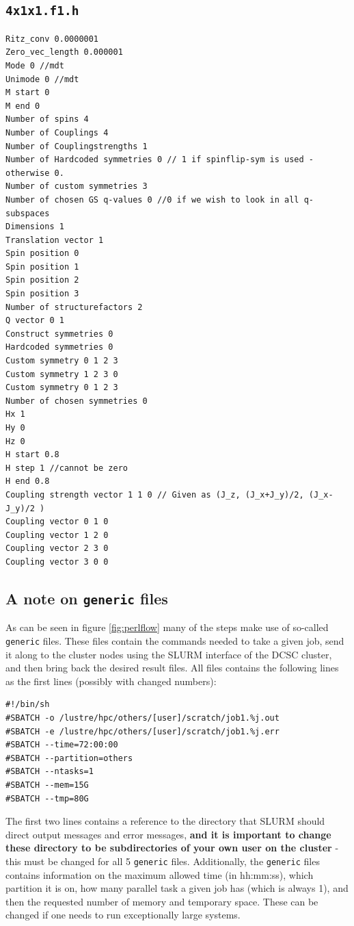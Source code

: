 \documentclass{article}
\begin{document}
\subsection{\texttt{4x1x1.f1.h}}
\begin{lstlisting}
Ritz_conv 0.0000001 
Zero_vec_length 0.000001
Mode 0 //mdt
Unimode 0 //mdt
M start 0
M end 0
Number of spins 4 
Number of Couplings 4 
Number of Couplingstrengths 1
Number of Hardcoded symmetries 0 // 1 if spinflip-sym is used - otherwise 0. 
Number of custom symmetries 3  
Number of chosen GS q-values 0 //0 if we wish to look in all q-subspaces
Dimensions 1
Translation vector 1
Spin position 0
Spin position 1
Spin position 2
Spin position 3
Number of structurefactors 2
Q vector 0 1
Construct symmetries 0
Hardcoded symmetries 0
Custom symmetry 0 1 2 3
Custom symmetry 1 2 3 0
Custom symmetry 0 1 2 3
Number of chosen symmetries 0
Hx 1
Hy 0
Hz 0
H start 0.8
H step 1 //cannot be zero
H end 0.8
Coupling strength vector 1 1 0 // Given as (J_z, (J_x+J_y)/2, (J_x-J_y)/2 )
Coupling vector 0 1 0
Coupling vector 1 2 0
Coupling vector 2 3 0
Coupling vector 3 0 0
\end{lstlisting}

\subsection{A note on \texttt{generic} files}
\label{sec:generic}
As can be seen in figure \ref{fig:perlflow} many of the steps make use of so-called \texttt{generic} files. These files contain the commands needed to take a given job, send it along to the cluster nodes using the SLURM interface of the DCSC cluster, and then bring back the desired result files.  All files contains the following lines as the first lines (possibly with changed numbers):
\begin{lstlisting}
#!/bin/sh
#SBATCH -o /lustre/hpc/others/[user]/scratch/job1.%j.out
#SBATCH -e /lustre/hpc/others/[user]/scratch/job1.%j.err
#SBATCH --time=72:00:00
#SBATCH --partition=others
#SBATCH --ntasks=1
#SBATCH --mem=15G
#SBATCH --tmp=80G
\end{lstlisting}
The first two lines contains a reference to the directory that SLURM should direct output messages and error messages, \textbf{and it is important to change these directory to be subdirectories of your own user on the cluster} - this must be changed for all 5 \texttt{generic} files. Additionally, the \texttt{generic} files contains information on the maximum allowed time (in hh:mm:ss), which partition it is on, how many parallel task a given job has (which is always 1), and then the requested number of memory and temporary space. These can be changed if one needs to run exceptionally large systems.
\end{document}
